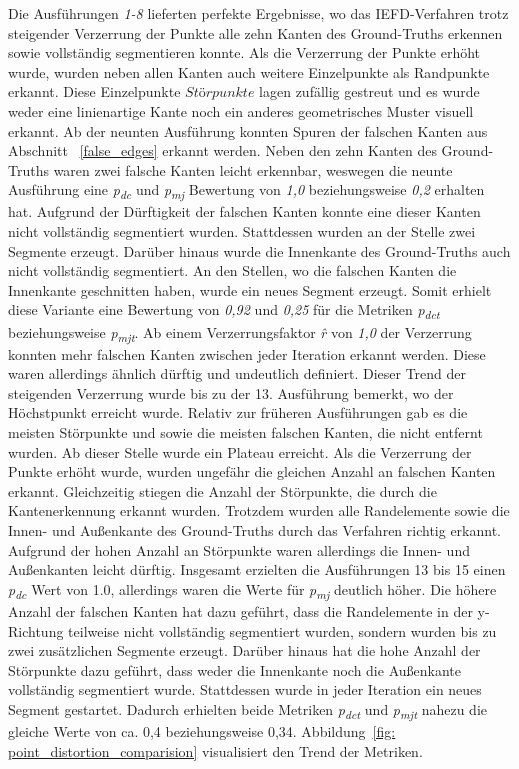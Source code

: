 Die Ausführungen \textit{1-8} lieferten perfekte Ergebnisse, wo das IEFD-Verfahren trotz steigender Verzerrung der Punkte alle zehn Kanten des Ground-Truths erkennen sowie vollständig segmentieren konnte. Als die Verzerrung der Punkte erhöht wurde, wurden neben allen Kanten auch weitere Einzelpunkte als Randpunkte erkannt. Diese Einzelpunkte \(Störpunkte\) lagen zufällig gestreut und es wurde weder eine linienartige Kante noch ein anderes geometrisches Muster visuell erkannt. Ab der neunten Ausführung konnten Spuren der falschen Kanten aus Abschnitt ~\ref{false_edges} erkannt werden. Neben den zehn Kanten des Ground-Truths waren zwei falsche Kanten leicht erkennbar, weswegen die neunte Ausführung eine \textit{p\textsubscript{dc}} und \textit{p\textsubscript{mj}} Bewertung von \textit{1,0} beziehungsweise \textit{0,2} erhalten hat. Aufgrund der Dürftigkeit der falschen Kanten konnte eine dieser Kanten nicht vollständig segmentiert wurden. Stattdessen wurden an der Stelle zwei Segmente erzeugt. Darüber hinaus wurde die Innenkante des Ground-Truths auch nicht vollständig segmentiert. An den Stellen, wo die falschen Kanten die Innenkante geschnitten haben, wurde ein neues Segment erzeugt. Somit erhielt diese Variante eine Bewertung von \textit{0,92} und \textit{0,25} für die Metriken \textit{p\textsubscript{dct}} beziehungsweise \textit{p\textsubscript{mjt}}. Ab einem Verzerrungsfaktor \textit{\^{r}} von \textit{1,0} der Verzerrung konnten mehr falschen Kanten zwischen jeder Iteration erkannt werden. Diese waren allerdings ähnlich dürftig und undeutlich definiert.  Dieser Trend der steigenden Verzerrung wurde bis zu der 13. Ausführung bemerkt, wo der Höchstpunkt erreicht wurde. Relativ zur früheren Ausführungen gab es die meisten Störpunkte und sowie die meisten falschen Kanten, die nicht entfernt wurden. Ab dieser Stelle wurde ein Plateau erreicht. Als die Verzerrung der Punkte erhöht wurde, wurden ungefähr die gleichen Anzahl an falschen Kanten erkannt. Gleichzeitig stiegen die Anzahl der Störpunkte, die durch die Kantenerkennung erkannt wurden. Trotzdem wurden alle Randelemente sowie die Innen- und Außenkante des Ground-Truths durch das Verfahren richtig erkannt. Aufgrund der hohen Anzahl an Störpunkte waren allerdings die Innen- und Außenkanten leicht dürftig. Insgesamt erzielten die Ausführungen 13 bis 15 einen \textit{p\textsubscript{dc}} Wert von 1.0, allerdings waren die Werte für \textit{p\textsubscript{mj}} deutlich höher. Die höhere Anzahl der falschen Kanten hat dazu geführt, dass die Randelemente in der y-Richtung teilweise nicht vollständig segmentiert wurden, sondern wurden bis zu zwei zusätzlichen Segmente erzeugt. Darüber hinaus hat die hohe Anzahl der Störpunkte dazu geführt, dass weder die Innenkante noch die Außenkante vollständig segmentiert wurde. Stattdessen wurde in jeder Iteration ein neues Segment gestartet. Dadurch erhielten beide Metriken \textit{p\textsubscript{dct}} und \textit{p\textsubscript{mjt}} nahezu die gleiche Werte von ca. 0,4 beziehungsweise 0,34. Abbildung~\ref{fig: point_distortion_comparision} visualisiert den Trend der Metriken. 

